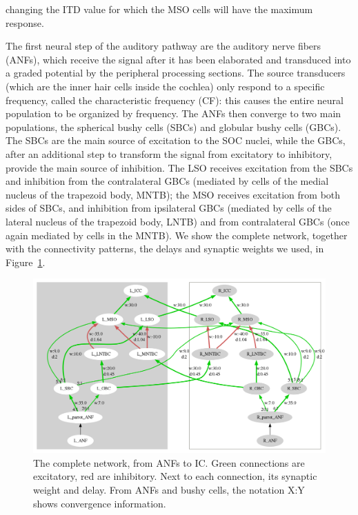 \documentclass[11pt,a4paper,twocolumn]{article}
\newcommand{\parspace}{\vspace{7pt}}
\begin{document}
changing the ITD value for which the MSO cells will have the maximum response.

\parspace
The first neural step of the auditory pathway are the auditory nerve fibers (ANFs), which receive the signal after it has been elaborated and transduced into a graded potential by the peripheral processing sections. The source transducers (which are the inner hair cells inside the cochlea) only respond to a specific frequency, called the characteristic frequency (CF): this causes the entire neural population to be organized by frequency. The ANFs then converge to two main populations, the spherical bushy cells (SBCs) and globular bushy cells (GBCs). The SBCs are the main source of excitation to the SOC nuclei, while the GBCs, after an additional step to transform the signal from excitatory to inhibitory, provide the main source of inhibition. The LSO receives excitation from the SBCs and inhibition from the contralateral GBCs (mediated by cells of the medial nucleus of the trapezoid body, MNTB); the MSO receives excitation from both sides of SBCs, and inhibition from ipsilateral GBCs (mediated by cells of the lateral nucleus of the trapezoid body, LNTB) and from contralateral GBCs (once again mediated by cells in the MNTB).
We show the complete network, together with the connectivity patterns, the delays and synaptic weights we used, in Figure~\ref{fig:network}.

\begin{figure}
    \centering
    \includegraphics[width=0.9\linewidth]{Images/netvis.png}
    \caption{The complete network, from ANFs to IC. Green connections are excitatory, red are inhibitory. Next to each connection, its synaptic weight and delay. From ANFs and bushy cells, the notation X:Y shows convergence information.}
    \label{fig:network}
\end{figure}
\end{document}
